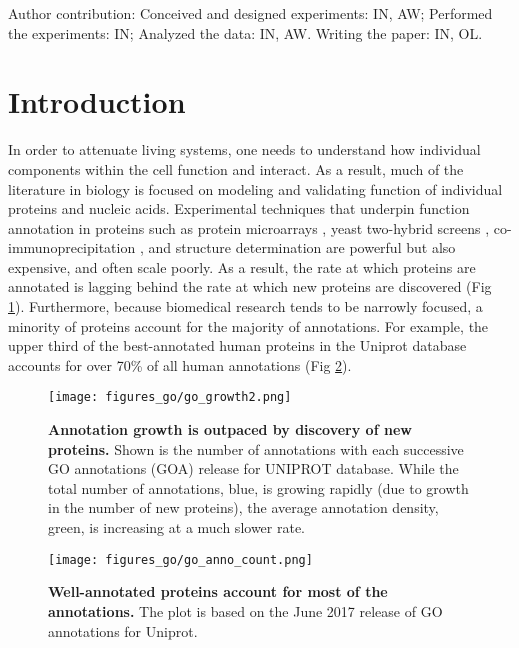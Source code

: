 \documentclass[12pt,a4paper]{report}
\begin{document}
Author contribution: Conceived and designed experiments: IN, AW; Performed the experiments: IN; Analyzed the data: IN, AW. Writing the paper: IN, OL.
\clearpage
\section{Introduction}

In order to attenuate living systems, one needs to understand how individual components within the cell function and interact. As a result, much of the literature in biology is focused on modeling and validating function of individual proteins and nucleic acids. Experimental techniques that underpin function annotation in proteins such as protein microarrays \cite{Sutandy2013_microarrays}, yeast two-hybrid screens \cite{Bruckner_yeast2h}, co-immunoprecipitation \cite{Iqbal_coip}, and structure determination \cite{Ilari_xray, Winey_EM, Bothwell_NMR} are powerful but also expensive, and often scale poorly. As a result, the rate at which proteins are annotated is lagging behind the rate at which new proteins are discovered (Fig \ref{fig:anno_growth}). Furthermore, because biomedical research tends to be narrowly focused, a minority of proteins account for the majority of annotations. For example, the upper third of the best-annotated human proteins in the Uniprot database \cite{uniprot} accounts for over 70\% of all human annotations (Fig \ref{fig:anno_count}).

\begin{figure}
\begin{minipage}[c][\textheight]{\textwidth}
\centering
\vspace*{-3in}
  \texttt{[image: figures\_go/go\_growth2.png]}
  \caption[Annotation growth is outpaced by discovery of new proteins.]{\textbf{Annotation growth is outpaced by discovery of new proteins.} Shown is the number of annotations with each successive GO annotations (GOA) release for UNIPROT database. While the total number of annotations, blue, is growing rapidly (due to growth in the number of new proteins), the average annotation density, green, is increasing at a much slower rate.}
  \label{fig:anno_growth}
 \end{minipage}
\end{figure}

\begin{figure}
\begin{minipage}[c][\textheight]{\textwidth}
\centering%
\vspace*{-3in}
  \texttt{[image: figures\_go/go\_anno\_count.png]}
  \caption[Well-annotated proteins account for most of the annotations.]{\textbf{Well-annotated proteins account for most of the annotations.} The plot is based on the June 2017 release of GO annotations for Uniprot.}
  \label{fig:anno_count}
 \end{minipage}
\end{figure}
\end{document}
